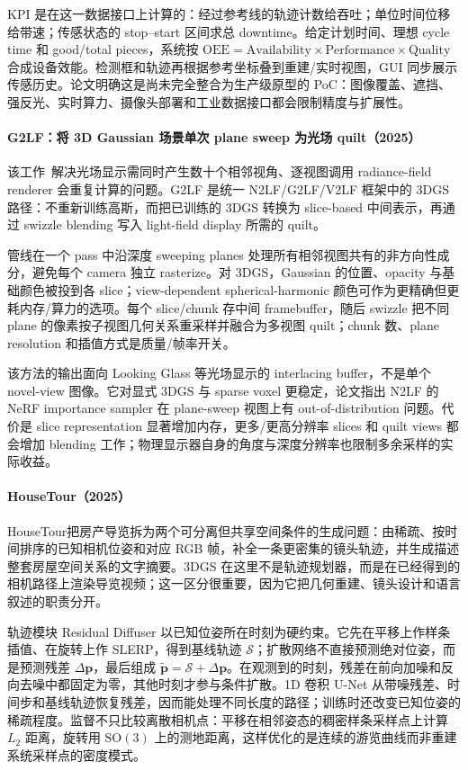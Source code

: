 KPI 是在这一数据接口上计算的：经过参考线的轨迹计数给吞吐；单位时间位移给带速；传感状态的 stop--start 区间求总 downtime。给定计划时间、理想 cycle time 和 good/total pieces，系统按 $\mathrm{OEE}=\mathrm{Availability}\times\mathrm{Performance}\times\mathrm{Quality}$ 合成设备效能。检测框和轨迹再根据参考坐标叠到重建/实时视图，GUI 同步展示传感历史。论文明确这是尚未完全整合为生产级原型的 PoC：图像覆盖、遮挡、强反光、实时算力、摄像头部署和工业数据接口都会限制精度与扩展性。

\paragraph{G2LF：将 3D Gaussian 场景单次 plane sweep 为光场 quilt（2025）\cite{2508_18540}}
该工作~\cite{2508_18540}解决光场显示需同时产生数十个相邻视角、逐视图调用 radiance-field renderer 会重复计算的问题。G2LF 是统一 N2LF/G2LF/V2LF 框架中的 3DGS 路径：不重新训练高斯，而把已训练的 3DGS 转换为 slice-based 中间表示，再通过 swizzle blending 写入 light-field display 所需的 quilt。

管线在一个 pass 中沿深度 sweeping planes 处理所有相邻视图共有的非方向性成分，避免每个 camera 独立 rasterize。对 3DGS，Gaussian 的位置、opacity 与基础颜色被投到各 slice；view-dependent spherical-harmonic 颜色可作为更精确但更耗内存/算力的选项。每个 slice/chunk 存中间 framebuffer，随后 swizzle 把不同 plane 的像素按子视图几何关系重采样并融合为多视图 quilt；chunk 数、plane resolution 和插值方式是质量/帧率开关。

该方法的输出面向 Looking Glass 等光场显示的 interlacing buffer，不是单个 novel-view 图像。它对显式 3DGS 与 sparse voxel 更稳定，论文指出 N2LF 的 NeRF importance sampler 在 plane-sweep 视图上有 out-of-distribution 问题。代价是 slice representation 显著增加内存，更多/更高分辨率 slices 和 quilt views 都会增加 blending 工作；物理显示器自身的角度与深度分辨率也限制多余采样的实际收益。

\paragraph{HouseTour（2025）\cite{2510_18054}}
HouseTour把房产导览拆为两个可分离但共享空间条件的生成问题：由稀疏、按时间排序的已知相机位姿和对应 RGB 帧，补全一条更密集的镜头轨迹，并生成描述整套房屋空间关系的文字摘要。3DGS 在这里不是轨迹规划器，而是在已经得到的相机路径上渲染导览视频；这一区分很重要，因为它把几何重建、镜头设计和语言叙述的职责分开。

轨迹模块 Residual Diffuser 以已知位姿所在时刻为硬约束。它先在平移上作样条插值、在旋转上作 SLERP，得到基线轨迹 $\mathcal S$；扩散网络不直接预测绝对位姿，而是预测残差 $\Delta\mathbf p$，最后组成 $\tilde{\mathbf p}=\mathcal S+\Delta\mathbf p$。在观测到的时刻，残差在前向加噪和反向去噪中都固定为零，其他时刻才参与条件扩散。1D 卷积 U-Net 从带噪残差、时间步和基线轨迹恢复残差，因而能处理不同长度的路径；训练时还改变已知位姿的稀疏程度。监督不只比较离散相机点：平移在相邻姿态的稠密样条采样点上计算 $L_2$ 距离，旋转用 $\mathrm{SO}(3)$ 上的测地距离，这样优化的是连续的游览曲线而非重建系统采样点的密度模式。

